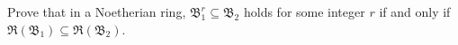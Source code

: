 Prove that in a Noetherian ring, $\mathfrak{B}_1^r \subseteq \mathfrak{B}_2$ holds for some integer $r$ if and only if $\mathfrak{R}(\mathfrak{B}_1) \subseteq \mathfrak{R}(\mathfrak{B}_2)$.
